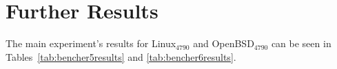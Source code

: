 \documentclass[acmsmall,screen]{acmart}
\newcommand{\bencherfive}{Linux$_\mathrm{4790}$\xspace}
\newcommand{\benchersix}{OpenBSD$_\mathrm{4790}$\xspace}
\newcommand{\bencherseven}{Linux$_\mathrm{1240v5}$\xspace}
\begin{document}
\begin{landscape}
\begin{table}[htp]
\caption{DaCapo results for \bencherfive.}
\centering
\begin{adjustbox}{scale=.9}

\end{adjustbox}
\label{tab:dacapo}
\end{table}
\end{landscape}


\begin{landscape}
\begin{table}[htp]
\caption{Octane results for \bencherfive.}
\centering
\begin{adjustbox}{scale=.9}

\end{adjustbox}
\label{tab:octaneb5}
\end{table}
\end{landscape}

\begin{table}[htp]
\centering
\caption{Octane results for \benchersix.}
\begin{adjustbox}{scale=.9}

\end{adjustbox}
\label{tab:octaneb6}
\end{table}

\begin{landscape}
\begin{table}[htp]
\caption{Octane results for \bencherseven.}
\centering
\begin{adjustbox}{scale=.9}

\end{adjustbox}
\label{tab:octaneb7}
\end{table}
\end{landscape}

\section{Further Results}
\label{app:mainresults}
\label{app:dacapo}
\label{app:octane}

\noindent The main experiment's results for \bencherfive and \benchersix can be
seen in Tables~\ref{tab:bencher5results} and \ref{tab:bencher6results}.

\begin{landscape}
\begin{table}[t]
\caption{Benchmark results for \bencherfive.}
\centering
\begin{adjustbox}{scale=.85} %

\end{adjustbox}
\label{tab:bencher5results}
\end{table}
\end{landscape}
\end{document}
